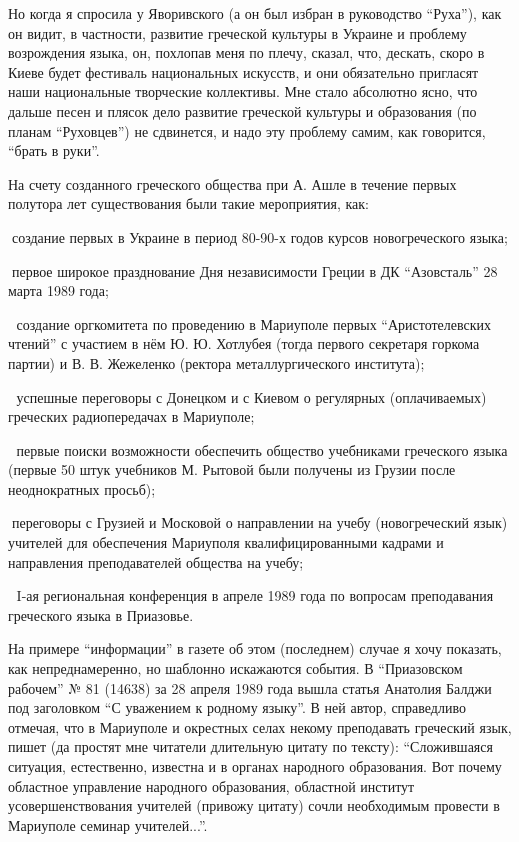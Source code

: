 Но когда я спросила у Яворивского (а он был избран в руководство \enquote{Руха}), как
он видит, в частности, развитие греческой культуры в Украине и проблему
возрождения языка, он, похлопав меня по плечу, сказал, что, дескать, скоро в
Киеве будет фестиваль национальных искусств, и они обязательно пригласят наши
национальные творческие коллективы. Мне стало абсолютно ясно, что дальше песен
и плясок дело развитие греческой культуры и образования (по планам \enquote{Руховцев})
не сдвинется, и надо эту проблему самим, как говорится, \enquote{брать в руки}.

На счету созданного греческого общества при А. Ашле в течение первых полутора
лет существования были такие мероприятия, как: 

📌создание первых в Украине в период 80-90-х годов курсов новогреческого языка; 

📌первое широкое празднование Дня независимости Греции в ДК \enquote{Азовсталь} 28 марта 1989 года;

📌 создание оргкомитета по проведению в Мариуполе первых \enquote{Аристотелевских
чтений} с участием в нём Ю. Ю. Хотлубея (тогда первого секретаря горкома партии)
и В. В. Жежеленко (ректора металлургического института);

📌 успешные переговоры с Донецком и с Киевом  о регулярных (оплачиваемых) греческих радиопередачах в Мариуполе;

📌 первые поиски возможности обеспечить общество учебниками греческого языка
(первые 50 штук учебников М. Рытовой были получены из Грузии после неоднократных
просьб); 

📌переговоры с Грузией и Московой о направлении на учебу (новогреческий язык)
учителей для обеспечения Мариуполя квалифицированными кадрами и направления
преподавателей общества на учебу;

📌 I-ая региональная конференция в апреле 1989 года по вопросам преподавания
греческого языка в Приазовье. 

На примере \enquote{информации} в газете об этом (последнем) случае я хочу показать,
как непреднамеренно, но шаблонно искажаются события. В \enquote{Приазовском рабочем} №
81 (14638) за 28 апреля 1989 года вышла статья Анатолия Балджи под заголовком
\enquote{С уважением к родному языку}. В ней автор, справедливо отмечая, что в
Мариуполе и окрестных селах некому преподавать греческий язык, пишет (да
простят мне читатели длительную цитату по тексту): \enquote{Сложившаяся ситуация,
естественно, известна и в органах народного образования. Вот почему областное
управление народного образования, областной институт усовершенствования
учителей (привожу цитату) сочли необходимым провести в Мариуполе семинар
учителей...}. 

